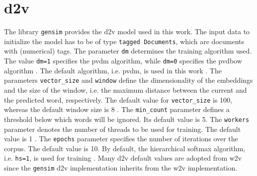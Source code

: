 \section{\ac{d2v}}\label{sec:impl-doc2vec}

The library \texttt{gensim} provides the \ac{d2v} model used in this work.
The input data to initialize the model has to be of type \texttt{tagged Documents}, which are documents with (numerical) tags.
The parameter \texttt{dm} determines the training algorithm used.
The value \texttt{dm=1} specifies the \ac{pvdm} algorithm, while \texttt{dm=0} specifies the \ac{pvdbow} algorithm \cite{gensim-doc2vec}.
The default algorithm, i.e. \ac{pvdm}, is used in this work \cite{gensim-word2vec-init}.
The parameters \texttt{vector\_size} and \texttt{window} define the dimensionality of the embeddings and the size of the window, 
i.e. the maximum distance between the current and the predicted word, respectively.
The default value for \texttt{vector\_size} is 100, whereas the default window size is 8 \cite{gensim-word2vec-init, gensim-doc2vec-init}.
The \texttt{min\_count} parameter defines a threshold below which words will be ignored.
Its default value is 5.
The \texttt{workers} parameter denotes the number of threads to be used for training.
The default value is 1 \cite{gensim-word2vec-init}.
The \texttt{epochs} parameter specifies the number of iterations over the corpus.
The default value is 10.
By default, the hierarchical softmax algorithm, i.e. \texttt{hs=1}, is used for training \cite{gensim-doc2vec}.
Many \ac{d2v} default values are adopted from \ac{w2v} since the \texttt{gensim} \ac{d2v} implementation inherits from the \ac{w2v} implementation.
